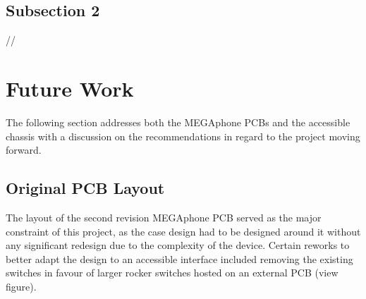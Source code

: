 \subsection{Subsection 2}
//


\section{Future Work}
The following section addresses both the MEGAphone PCBs and the accessible chassis with a discussion on the recommendations in regard to the project moving forward.

\subsection{Original PCB Layout}

The layout of the second revision MEGAphone PCB served as the major constraint of this project, as the case design had to be designed around it without any significant redesign due to the complexity of the device. 
Certain reworks to better adapt the design to an accessible interface included removing the existing switches in favour of larger rocker switches hosted on an external PCB (view figure).

